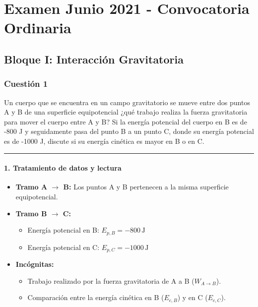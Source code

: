 \chapter{Examen Junio 2021 - Convocatoria Ordinaria}
\label{chap:2021_jun_ord}


\section{Bloque I: Interacción Gravitatoria}
\label{sec:grav_2020_sep_ext}


\subsection{Cuestión 1}
\label{subsec:C1_2021_jun_ord}

\begin{cajaenunciado}
Un cuerpo que se encuentra en un campo gravitatorio se mueve entre dos puntos A y B de una superficie equipotencial ¿qué trabajo realiza la fuerza gravitatoria para mover el cuerpo entre A y B?
Si la energía potencial del cuerpo en B es de -800 J y seguidamente pasa del punto B a un punto C, donde su energía potencial es de -1000 J, discute si su energía cinética es mayor en B o en C.
\end{cajaenunciado}
\hrule

\subsubsection*{1. Tratamiento de datos y lectura}
\begin{itemize}
    \item \textbf{Tramo A $\to$ B:} Los puntos A y B pertenecen a la misma superficie equipotencial.
    \item \textbf{Tramo B $\to$ C:}
    \begin{itemize}
        \item Energía potencial en B: $E_{p,B} = -800 \, \text{J}$
        \item Energía potencial en C: $E_{p,C} = -1000 \, \text{J}$
    \end{itemize}
    \item \textbf{Incógnitas:}
    \begin{itemize}
        \item Trabajo realizado por la fuerza gravitatoria de A a B ($W_{A \to B}$).
        \item Comparación entre la energía cinética en B ($E_{c,B}$) y en C ($E_{c,C}$).
    \end{itemize}
\end{itemize}

